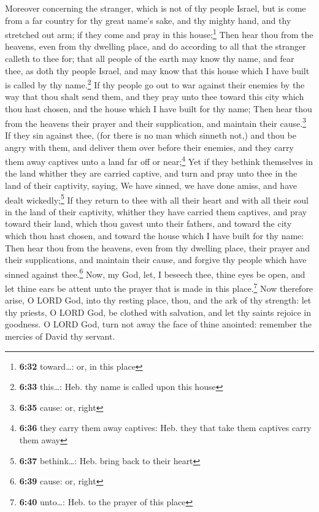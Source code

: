  Moreover concerning the stranger, which is not of thy
people Israel, but is come from a far country for thy great name's sake,
and thy mighty hand, and thy stretched out arm; if they come and pray in
this house;\footnote{\textbf{6:32} toward\ldots: or, in this place}
 Then hear thou from the heavens, even from thy dwelling
place, and do according to all that the stranger calleth to thee for;
that all people of the earth may know thy name, and fear thee, as doth
thy people Israel, and may know that this house which I have built is
called by thy name.\footnote{\textbf{6:33} this\ldots: Heb. thy name is
  called upon this house}  If thy people go out to war
against their enemies by the way that thou shalt send them, and they
pray unto thee toward this city which thou hast chosen, and the house
which I have built for thy name;  Then hear thou from the
heavens their prayer and their supplication, and maintain their
cause.\footnote{\textbf{6:35} cause: or, right}  If they
sin against thee, (for there is no man which sinneth not,) and thou be
angry with them, and deliver them over before their enemies, and they
carry them away captives unto a land far off or near;\footnote{\textbf{6:36}
  they carry them away captives: Heb. they that take them captives carry
  them away}  Yet if they bethink themselves in the land
whither they are carried captive, and turn and pray unto thee in the
land of their captivity, saying, We have sinned, we have done amiss, and
have dealt wickedly;\footnote{\textbf{6:37} bethink\ldots: Heb. bring
  back to their heart}  If they return to thee with all
their heart and with all their soul in the land of their captivity,
whither they have carried them captives, and pray toward their land,
which thou gavest unto their fathers, and toward the city which thou
hast chosen, and toward the house which I have built for thy name:
 Then hear thou from the heavens, even from thy dwelling
place, their prayer and their supplications, and maintain their cause,
and forgive thy people which have sinned against thee.\footnote{\textbf{6:39}
  cause: or, right}  Now, my God, let, I beseech thee,
thine eyes be open, and let thine ears be attent unto the prayer that is
made in this place.\footnote{\textbf{6:40} unto\ldots: Heb. to the
  prayer of this place}  Now therefore arise, O LORD God,
into thy resting place, thou, and the ark of thy strength: let thy
priests, O LORD God, be clothed with salvation, and let thy saints
rejoice in goodness.  O LORD God, turn not away the face
of thine anointed: remember the mercies of David thy servant.

